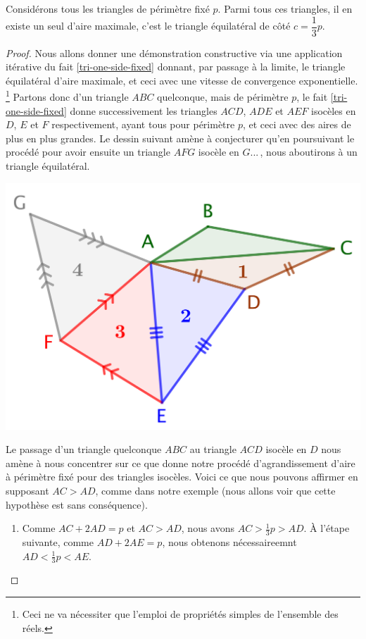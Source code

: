 \begin{fact} \label{iso-tri}
	Considérons tous les triangles de périmètre fixé $p$. Parmi tous ces triangles, il en existe un seul d'aire maximale, c'est le triangle équilatéral de côté $c = \dfrac13 p$.
\end{fact}


\begin{proof}	
	Nous allons donner une démonstration constructive via une application itérative du fait \ref{tri-one-side-fixed} donnant, par passage à la limite, le triangle équilatéral d'aire maximale, et ceci avec une vitesse de convergence exponentielle.%
	\footnote{
		Ceci ne va nécessiter que l'emploi de propriétés simples de l'ensemble des réels.
	}
	Partons donc d'un triangle $ABC$ quelconque, mais de périmètre $p$, le fait \ref{tri-one-side-fixed} donne successivement les triangles $ACD$, $ADE$ et $AEF$ isocèles en $D$, $E$ et $F$ respectivement, ayant tous pour périmètre $p$, et ceci avec des aires de plus en plus grandes.  
	Le dessin suivant amène à conjecturer qu'en poursuivant le procédé pour avoir ensuite un triangle $AFG$ isocèle en $G$...\,, nous aboutirons  à un triangle équilatéral.

	\begin{center}
		\includegraphics[scale=.4]{content/triangle-gene/proof.png}
	\end{center} 

	
	Le passage d'un triangle quelconque $ABC$ au triangle $ACD$ isocèle en $D$ nous amène à nous concentrer sur ce que donne notre procédé d'agrandissement d'aire à périmètre fixé pour des triangles isocèles. 
	Voici ce que nous pouvons affirmer en supposant $AC > AD$, comme dans notre exemple (nous allons voir que cette hypothèse est sans conséquence).
	\begin{enumerate}
		\item Comme $AC + 2 AD = p$ et $AC > AD$, nous avons $AC > \frac13 p > AD$.
		À l'étape suivante, comme $AD + 2 AE = p$, nous obtenons nécessaireemnt $AD < \frac13 p < AE$.



\end{enumerate}
\end{proof}
